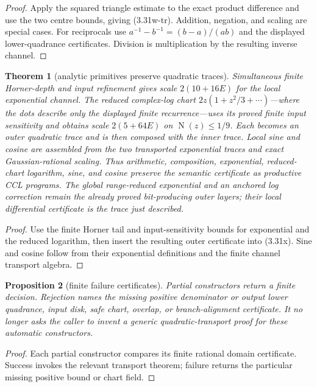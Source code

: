 \documentclass[10pt]{article}
\newtheorem{theorem}{Theorem}[section]
\newtheorem{proposition}[theorem]{Proposition}
\theoremstyle{definition}
\theoremstyle{remark}
\newcommand{\Norm}{\operatorname{N}}
\begin{document}
\begin{proof}
Apply the squared triangle estimate to the exact product difference and use
the two centre bounds, giving (3.31w-tr).  Addition, negation, and scaling are
special cases.  For reciprocals use
$a^{-1}-b^{-1}=(b-a)/(ab)$ and the displayed lower-quadrance certificates.
Division is multiplication by the resulting inverse channel.
\end{proof}

\begin{theorem}[analytic primitives preserve quadratic traces]
Simultaneous finite
Horner-depth and input refinement gives scale $2(10+16E)$ for the local
exponential channel.  The reduced complex-log chart
$2z(1+z^2/3+\cdots)$---where the dots describe only the displayed finite
recurrence---uses its proved finite input sensitivity and obtains scale
$2(5+64E)$ on $\Norm(z)\le1/9$.  Each becomes an outer quadratic trace and is
then composed with the inner trace.  Local sine and cosine are assembled from
the two transported exponential traces and exact Gaussian-rational scaling.
Thus arithmetic, composition, exponential, reduced-chart logarithm, sine,
and cosine preserve the semantic certificate as productive CCL programs.
The global range-reduced exponential and an anchored log correction remain
the already proved bit-producing outer layers; their local differential
certificate is the trace just described.
\end{theorem}

\begin{proof}
Use the finite Horner tail and input-sensitivity bounds for exponential and
the reduced logarithm, then insert the resulting outer certificate into
(3.31x).  Sine and cosine follow from their exponential definitions and the
finite channel transport algebra.
\end{proof}

\begin{proposition}[finite failure certificates]
Partial constructors return a finite decision.  Rejection names the
missing positive denominator or output lower quadrance, input disk,
safe chart, overlap, or branch-alignment certificate.  It no longer asks the
caller to invent a generic quadratic-transport proof for these automatic
constructors.
\end{proposition}

\begin{proof}
Each partial constructor compares its finite rational domain certificate.
Success invokes the relevant transport theorem; failure returns the
particular missing positive bound or chart field.
\end{proof}
\end{document}

